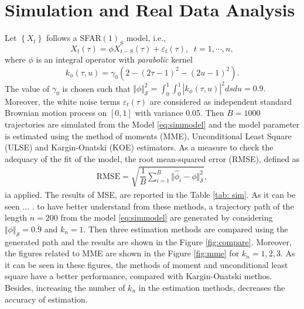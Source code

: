 \documentclass[11pt,a4paper]{article}
\numberwithin{equation}{section}
\begin{document}

\section{Simulation and Real Data Analysis}\label{sec:simulation}

Let $\left\{X_t\right\}$ follows a  SFAR$(1)_S$ model, i.e., 
\begin{equation}
\label{eq:simmodel}
X_t\left(\tau\right)=\phi X_{t-S}\left(\tau\right)+\varepsilon_t\left(\tau\right),\;\;t=1,\cdots, n,
\end{equation}
where $\phi$ is an integral operator with \textit{parabolic} kernel
\begin{equation*}
\label{eq:parabolic}
k_\phi\left(\tau,u\right)=\gamma_0\left(2-\left(2\tau-1\right)^2-\left(2u-1\right)^2\right).
\end{equation*}
The value of  $\gamma_0$ is chosen such that {\color{red}$\Vert \phi \Vert_\mathcal{S}^2=\int_0^1\int_0^1\left|k_\phi\left(\tau,u\right)\right|^2ds du=0.9.$} Moreover, the white noise terms $\varepsilon_t\left(\tau\right)$ are considered as independent standard Brownian motion process on $\left[0, 1\right]$ with variance 0.05. Then $B=1000$ trajectories are simulated from the Model \eqref{eq:simmodel} and the model parameter is estimated using the method of moments (MME), Unconditional Least Square (ULSE) and Kargin-Onatski (KOE) estimators. As a measure to check the adequacy of the fit of the model, the root mean-squared error (RMSE), defined as
\begin{align}
  \text{RMSE} = \sqrt{\dfrac{1}{B}\sum_{i=1}^B \Vert \hat{\phi}_i -\phi \Vert_\mathcal{S}^2},
\end{align} ia applied.
The results of MSE, are reported in the Table \ref{tab: sim}. As it can be seen ... . to have better understand from these methods, a trajectory path of the length $n=200$ from the model \eqref{eq:simmodel} are generated by considering $\Vert \phi\Vert_\mathcal{S}=0.9$ and $k_n=1.$ Then three estimation methods are compared using the generated path and the results are shown in the Figure \ref{fig:compare}. Moreover, the figures related to MME are shown in the Figure \ref{fig:mme} for $k_n=1, 2, 3$. As it can be seen in these figures, the methods of moment and unconditional least square have a better performance, compared with Kargin-Onatski methos. Besides, increasing the number of $k_n$ in the estimation methods, decreases the accuracy of estimation. 
\end{document}
